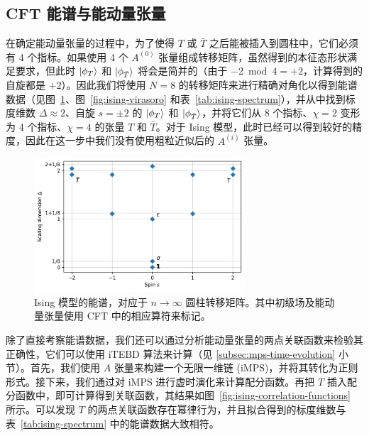 \subsection{CFT 能谱与能动量张量}

在确定能动量张量的过程中，为了使得 $T$ 或 $\bar{T}$ 之后能被插入到圆柱中，它们必须有 4 个指标。如果使用 4 个 $A^{(0)}$ 张量组成转移矩阵，虽然得到的本征态形状满足要求，但此时 $\ket*{\phi_T}$ 和 $\ket*{\phi_{\bar{T}}}$ 将会是简并的（由于 $-2\bmod4=+2$，计算得到的自旋都是 $+2$）。因此我们将使用 $N=8$ 的转移矩阵来进行精确对角化以得到能谱数据（见图~\ref{fig:ising-spectrum}、图~\ref{fig:ising-virasoro} 和表~\ref{tab:ising-spectrum}），并从中找到标度维数 $\Delta\approx2$、自旋 $s=\pm2$ 的 $\ket*{\phi_T}$ 和 $\ket*{\phi_{\bar{T}}}$，并将它们从 8 个指标、$\chi=2$ 变形为 4 个指标、$\chi=4$ 的张量 $T$ 和 $\bar{T}$。对于 Ising 模型，此时已经可以得到较好的精度，因此在这一步中我们没有使用粗粒近似后的 $A^{(i)}$ 张量。

\begin{figure}[ht]
  \centering
  \includegraphics[width=0.7\textwidth]{images/fibonacci/ising-spectrum.pdf}
  \caption[Ising 模型的能谱]{Ising 模型的能谱，对应于 $n\to\infty$ 圆柱转移矩阵。其中初级场及能动量张量使用 CFT 中的相应算符来标记。}
  \label{fig:ising-spectrum}
\end{figure}

除了直接考察能谱数据，我们还可以通过分析能动量张量的两点关联函数来检验其正确性，它们可以使用 iTEBD 算法来计算（见 \ref{subsec:mps-time-evolution} 小节）。首先，我们使用 $A$ 张量来构建一个无限一维链 (iMPS)，并将其转化为正则形式。接下来，我们通过对 iMPS 进行虚时演化来计算配分函数。再把 $T$ 插入配分函数中，即可计算得到关联函数，其结果如图~\ref{fig:ising-correlation-functions} 所示。可以发现 $T$ 的两点关联函数存在幂律行为，并且拟合得到的标度维数与表~\ref{tab:ising-spectrum} 中的能谱数据大致相符。


